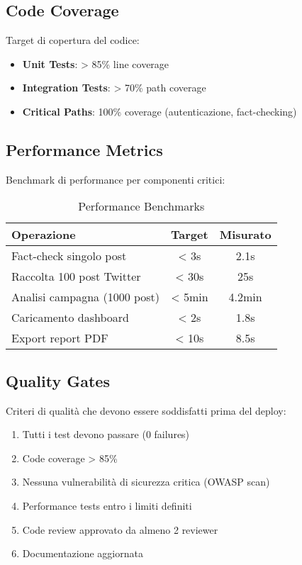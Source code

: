 \documentclass[12pt,a4paper]{report}
\begin{document}
\subsection{Code Coverage}

Target di copertura del codice:
\begin{itemize}
    \item \textbf{Unit Tests}: > 85\% line coverage
    \item \textbf{Integration Tests}: > 70\% path coverage
    \item \textbf{Critical Paths}: 100\% coverage (autenticazione, fact-checking)
\end{itemize}

\subsection{Performance Metrics}

Benchmark di performance per componenti critici:

\begin{table}[H]
\centering
\begin{tabular}{@{}lcc@{}}
\toprule
\textbf{Operazione} & \textbf{Target} & \textbf{Misurato} \\
\midrule
Fact-check singolo post & < 3s & 2.1s \\
Raccolta 100 post Twitter & < 30s & 25s \\
Analisi campagna (1000 post) & < 5min & 4.2min \\
Caricamento dashboard & < 2s & 1.8s \\
Export report PDF & < 10s & 8.5s \\
\bottomrule
\end{tabular}
\caption{Performance Benchmarks}
\label{tab:performance-metrics}
\end{table}

\subsection{Quality Gates}

Criteri di qualità che devono essere soddisfatti prima del deploy:

\begin{enumerate}
    \item Tutti i test devono passare (0 failures)
    \item Code coverage > 85\%
    \item Nessuna vulnerabilità di sicurezza critica (OWASP scan)
    \item Performance tests entro i limiti definiti
    \item Code review approvato da almeno 2 reviewer
    \item Documentazione aggiornata
\end{enumerate}
\end{document}
